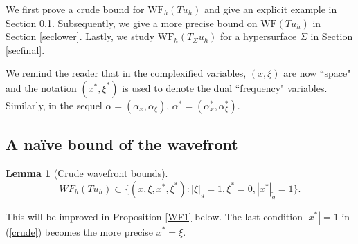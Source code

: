 \documentclass[11pt,reqno]{amsart}
\newcommand{\WF}{\text{WF}}
\newtheorem{lemma}[theorem]{Lemma}
\theoremstyle{definition}
\begin{document}
We first prove a crude bound for $\WF_h(Tu_h)$ and give an explicit example in Section \ref{subsection crude}. Subsequently, we give a more precise bound on $\WF(Tu_h)$ in Section \ref{seclower}. Lastly,   we study $\WF_h(T_\Sigma u_h)$ for a hypersurface $\Sigma$ in Section \ref{secfinal}.


 We remind the reader that in the complexified variables, $(x,\xi)$ are now “space" and the notation $(x^*,\xi^*)$ is used to denote the dual “frequency" variables. Similarly, in the sequel $\alpha=(\alpha_x,\alpha_\xi)$, $\alpha^*=(\alpha_x^*,\alpha_\xi^*)$.

\subsection{A na\"ive bound of the wavefront}\label{subsection crude}


\begin{lemma}[Crude wavefront bounds]\label{lemcrude}
    \begin{equation}\label{crude}
    WF_h(Tu_h)\subset \{(x,\xi,x^*,\xi^*):|\xi|_g=1,\xi^*=0,|x^*|_{\tilde{g}}=1\}.
\end{equation}
\end{lemma}
This will be improved in Proposition \ref{WF1} below. The last condition $|x^*|=1$ in (\ref{crude}) becomes the more precise $x^*=\xi$. 
\end{document}
